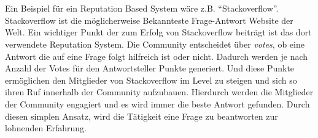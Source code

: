 \documentclass[a4paper,12pt,twoside]{scrartcl}
\begin{document}
\\\\
Ein Beispiel für ein Reputation Based System wäre z.B. \enquote{Stackoverflow}. Stackoverflow ist die möglicherweise Bekannteste Frage-Antwort Website der Welt. Ein wichtiger Punkt der zum Erfolg von Stackoverflow beiträgt ist das dort verwendete Reputation System. Die Community entscheidet über \textit{votes}, ob eine Antwort die auf eine Frage folgt hilfreich ist oder nicht. Dadurch werden je nach Anzahl der Votes für den Antwortsteller Punkte generiert. Und diese Punkte ermöglichen den Mitglieder von Stackoverflow im Level zu steigen und sich so ihren Ruf innerhalb der Community aufzubauen. Hierdurch werden die Mitglieder der Community engagiert und es wird immer die beste Antwort gefunden. Durch diesen simplen Ansatz, wird die Tätigkeit eine Frage zu beantworten zur lohnenden Erfahrung.
\end{document}
